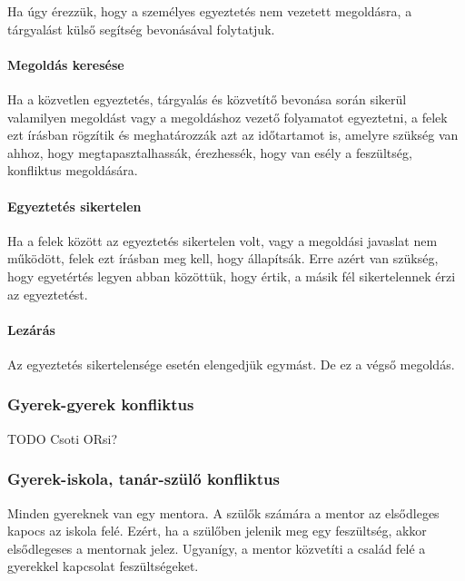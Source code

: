 Ha úgy érezzük, hogy a személyes egyeztetés nem vezetett megoldásra, a
tárgyalást külső segítség bevonásával folytatjuk.

\paragraph{Megoldás keresése}\label{megolduxe1s-keresuxe9se}

Ha a közvetlen egyeztetés, tárgyalás és közvetítő bevonása során sikerül
valamilyen megoldást vagy a megoldáshoz vezető folyamatot egyeztetni, a
felek ezt írásban rögzítik és meghatározzák azt az időtartamot is,
amelyre szükség van ahhoz, hogy megtapasztalhassák, érezhessék, hogy van
esély a feszültség, konfliktus megoldására.

\paragraph{Egyeztetés sikertelen}\label{egyeztetuxe9s-sikertelen}

Ha a felek között az egyeztetés sikertelen volt, vagy a megoldási
javaslat nem működött, felek ezt írásban meg kell, hogy állapítsák. Erre
azért van szükség, hogy egyetértés legyen abban közöttük, hogy értik, a
másik fél sikertelennek érzi az egyeztetést.

\paragraph{Lezárás}\label{lezuxe1ruxe1s}

Az egyeztetés sikertelensége esetén elengedjük egymást. De ez a végső
megoldás.

\subsubsection{Gyerek-gyerek
konfliktus}\label{gyerek-gyerek-konfliktus}

TODO Csoti ORsi?

\subsubsection{Gyerek-iskola, tanár-szülő
konfliktus}\label{gyerek-iskola-tanuxe1r-szuxfclux151-konfliktus}

Minden gyereknek van egy mentora. A szülők számára a mentor az
elsődleges kapocs az iskola felé. Ezért, ha a szülőben jelenik meg egy
feszültség, akkor elsődlegeses a mentornak jelez. Ugyanígy, a mentor
közvetíti a család felé a gyerekkel kapcsolat feszültségeket.

